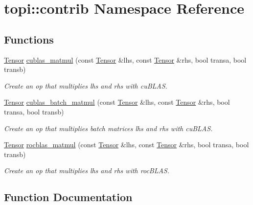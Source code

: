 \hypertarget{namespacetopi_1_1contrib}{}\section{topi\+:\+:contrib Namespace Reference}
\label{namespacetopi_1_1contrib}
\subsection*{Functions}
\begin{DoxyCompactItemize}
\item 
\hyperlink{classtvm_1_1te_1_1Tensor}{Tensor} \hyperlink{namespacetopi_1_1contrib_ac8dd65fd0460aa0e6045940fd22849df}{cublas\+\_\+matmul} (const \hyperlink{classtvm_1_1te_1_1Tensor}{Tensor} \&lhs, const \hyperlink{classtvm_1_1te_1_1Tensor}{Tensor} \&rhs, bool transa, bool transb)
\begin{DoxyCompactList}\small\item\em Create an op that multiplies lhs and rhs with cu\+B\+L\+AS. \end{DoxyCompactList}\item 
\hyperlink{classtvm_1_1te_1_1Tensor}{Tensor} \hyperlink{namespacetopi_1_1contrib_ae4f4c081cd2c1efa544752edcad0a3a1}{cublas\+\_\+batch\+\_\+matmul} (const \hyperlink{classtvm_1_1te_1_1Tensor}{Tensor} \&lhs, const \hyperlink{classtvm_1_1te_1_1Tensor}{Tensor} \&rhs, bool transa, bool transb)
\begin{DoxyCompactList}\small\item\em Create an op that multiplies batch matrices lhs and rhs with cu\+B\+L\+AS. \end{DoxyCompactList}\item 
\hyperlink{classtvm_1_1te_1_1Tensor}{Tensor} \hyperlink{namespacetopi_1_1contrib_aa120dd31a4165d9f554da02fdf419d78}{rocblas\+\_\+matmul} (const \hyperlink{classtvm_1_1te_1_1Tensor}{Tensor} \&lhs, const \hyperlink{classtvm_1_1te_1_1Tensor}{Tensor} \&rhs, bool transa, bool transb)
\begin{DoxyCompactList}\small\item\em Create an op that multiplies lhs and rhs with roc\+B\+L\+AS. \end{DoxyCompactList}\end{DoxyCompactItemize}


\subsection{Function Documentation}
